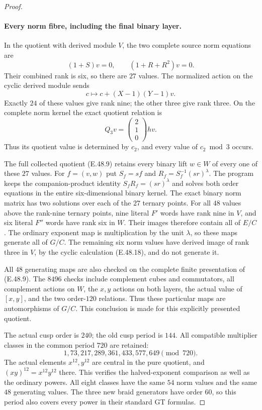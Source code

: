 \begin{proof}
\paragraph{Every norm fibre, including the final binary layer.}
In the quotient with derived module $V$, the two complete
source norm equations are
\[
            (1+S)v=0,\qquad(1+R+R^2)v=0.
 \tag{E.48.17}
\]
Their combined rank is six, so there are $27$ values.
The normalized action on the cyclic derived module sends
\[
          c\longmapsto c+(X-1)(Y-1)v.
 \tag{E.48.18}
\]
Exactly $24$ of these values give rank nine;
the other three give rank three.
On the complete norm kernel the exact quotient relation is
\[
              Q_3v=\begin{pmatrix}2\\1\\0\end{pmatrix}hv.
 \tag{E.48.19}
\]
Thus its quotient value is determined by $c_2$,
and every value of $c_2\bmod3$ occurs.

The full collected quotient \textup{(E.48.9)} retains
every binary lift $w\in W$ of every one of these $27$ values.
For $f=(v,w)$ put $S_f=sf$ and
$R_f=S_f^{-1}(sr)^\lambda$.
The program keeps the companion-product identity
$S_fR_f=(sr)^\lambda$ and solves both order equations
in the entire six-dimensional binary kernel.
The exact binary norm matrix has two solutions over each
of the $27$ ternary points.
For all $48$ values above the rank-nine ternary points,
nine literal $F'$ words have rank nine in $V$, and six
literal $F''$ words have rank six in $W$.
Their images therefore contain all of $E/C$.
The ordinary exponent map is multiplication by the unit
$\lambda$, so these maps generate all of $G/C$.
The remaining six norm values have derived image of rank
three in $V$, by the cyclic calculation
\textup{(E.48.18)}, and do not generate it.

All $48$ generating maps are also checked on the complete
finite presentation of \textup{(E.48.9)}.
The $8496$ checks include complement cubes and commutators,
all complement actions on $W$, the $x,y$ actions on both
layers, the actual value of $[x,y]$, and the two order-$120$
relations.
Thus these particular maps are automorphisms of $G/C$.
This conclusion is made for this explicitly presented quotient.

The actual cusp order is $240$; the old cusp period is $144$.
All compatible multiplier classes in the common period $720$
are retained:
\[
                1,73,217,289,361,433,577,649\pmod{720}.
 \tag{E.48.20}
\]
The actual elements $x^{12},y^{12}$ are central in the pure
quotient, and $(xy)^{12}=x^{12}y^{12}$ there.
This verifies the halved-exponent comparison as well as the
ordinary powers.
All eight classes have the same $54$ norm values and the same
$48$ generating values.
The three new braid generators have order $60$, so this period
also covers every power in their standard GT formulas.


\end{proof}
